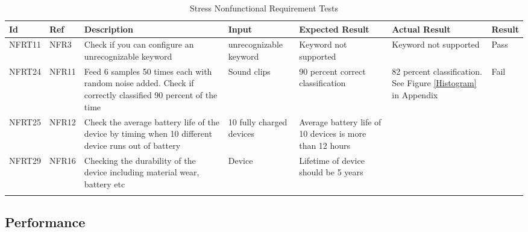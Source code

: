 \documentclass[12pt, titlepage]{article}
\begin{document}
\begin{longtable}{|p{1.4cm}|p{1.4cm}|p{3cm}|p{1.5cm}|p{2.5cm}|p{2cm}|p{1.2cm}|}

  \endfirsthead
  \endhead
  \hline
  \textbf{Id} & \textbf{Ref} & \textbf{Description}                                                         & \textbf{Input}                                    & \textbf{Expected Result}    & \textbf{Actual Result}                          & \textbf{Result}                                     \\ \hline
  NFRT11        & NFR3          & Check if you can configure an unrecognizable keyword              & unrecognizable keyword                          & Keyword not supported                      & Keyword not supported                         & {\color[HTML]{32CB00} Pass}                         \\ \hline
  NFRT24        & NFR11         & Feed 6 samples 50 times each with random noise added. Check if correctly classified 90 percent of the time           & Sound clips   & 90 percent correct classification        & 82 percent classification. See Figure \ref*{Histogram} in Appendix     & {\color[HTML]{FE0000} Fail}                           \\ \hline
  NFRT25        & NFR12         & Check the average battery life of the device by timing when 10 different device runs out of battery  & 10 fully charged devices   & Average battery life of 10 devices is more than 12 hours                   &                     &\cellcolor[HTML]{FFFFFF}{\color[HTML]{F8A102} TBD}                          \\ \hline
  NFRT29        & NFR16         & Checking the durability of the device including material wear, battery etc & Device  & Lifetime of device should be 5 years&          & \cellcolor[HTML]{FFFFFF}{\color[HTML]{F8A102} TBD}                        \\ \hline
  \caption{Stress Nonfunctional Requirement Tests}
  \label{stressNonfunctionalRequirementTests}
\end{longtable}
\subsection{Performance}
\end{document}
